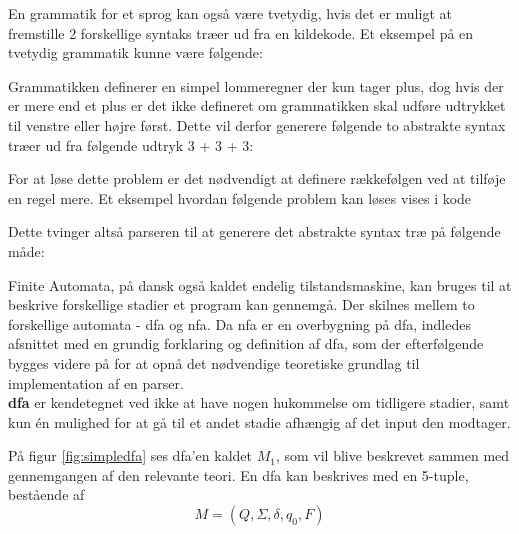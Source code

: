 

\noindent En grammatik for et sprog kan også være tvetydig, hvis det er muligt at fremstille 2 forskellige syntaks træer ud fra en kildekode. Et eksempel på en tvetydig grammatik kunne være følgende:




Grammatikken definerer en simpel lommeregner der kun tager plus, dog hvis der er mere end et plus er det ikke defineret om grammatikken skal udføre udtrykket til venstre eller højre først. Dette vil derfor generere følgende to abstrakte syntax træer ud fra følgende udtryk 3 + 3 + 3:

For at løse dette problem er det nødvendigt at definere rækkefølgen ved at tilføje en regel mere. Et eksempel hvordan følgende problem kan løses vises i kode 


Dette tvinger altså parseren til at generere det abstrakte syntax træ på følgende måde:

Finite Automata, på dansk også kaldet endelig tilstandsmaskine, kan bruges til at beskrive forskellige stadier et program kan gennemgå. Der skilnes mellem to forskellige automata - \gls{dfa} og \gls{nfa}. Da \gls{nfa} er en overbygning på \gls{dfa}, indledes afsnittet med en grundig forklaring og definition af \gls{dfa}, som der efterfølgende bygges videre på for at opnå det nødvendige teoretiske grundlag til implementation af en parser.\\

\noindent \textbf{\gls{dfa}} er kendetegnet ved ikke at have nogen hukommelse om tidligere stadier, samt kun én mulighed for at gå til et andet stadie afhængig af det input den modtager.


\noindent På figur \ref{fig:simpledfa} ses \gls{dfa}'en kaldet $M_1$, som vil blive beskrevet sammen med gennemgangen af den relevante teori. En \gls{dfa} kan beskrives med en 5-tuple, bestående af \[M = (Q, \Sigma, \delta, q_0, F)\]


